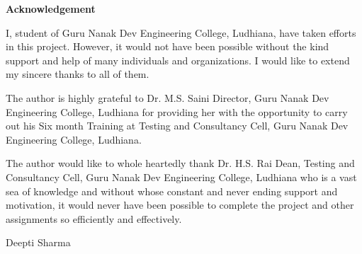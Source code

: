 \begin{center}
{\Huge \bf{Acknowledgement}\vskip 0.2in}
\end{center}

I, student of Guru Nanak Dev Engineering College, Ludhiana, have taken efforts in this project.
However, it would not have been possible without the kind support and help of many individuals
and organizations. I would like to extend my sincere thanks to all of them.

The author is highly grateful to Dr. M.S. Saini Director, Guru Nanak Dev Engineering College, Ludhiana for providing her with the opportunity to carry out his Six month Training at
Testing and Consultancy Cell, Guru Nanak Dev Engineering College, Ludhiana.

The author would like to whole heartedly thank Dr. H.S. Rai Dean, Testing and Consultancy
Cell, Guru Nanak Dev Engineering College, Ludhiana who is a vast sea of knowledge and without whose constant and never ending support and motivation, it would never have been possible to complete the project and other assignments so efficiently and effectively.

\vskip 1.0cm 
\noindent Deepti Sharma




